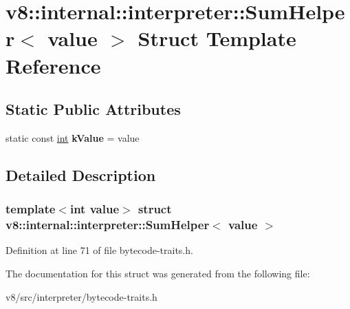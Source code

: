 \hypertarget{structv8_1_1internal_1_1interpreter_1_1SumHelper_3_01value_01_4}{}\section{v8\+:\+:internal\+:\+:interpreter\+:\+:Sum\+Helper$<$ value $>$ Struct Template Reference}
\label{structv8_1_1internal_1_1interpreter_1_1SumHelper_3_01value_01_4}
\subsection*{Static Public Attributes}
\begin{DoxyCompactItemize}
\item 
\mbox{\label{structv8_1_1internal_1_1interpreter_1_1SumHelper_3_01value_01_4_a1d4f285b4e2d654ca1549e40f2d1a085}} 
static const \mbox{\hyperlink{classint}{int}} {\bfseries k\+Value} = value
\end{DoxyCompactItemize}


\subsection{Detailed Description}
\subsubsection*{template$<$int value$>$\newline
struct v8\+::internal\+::interpreter\+::\+Sum\+Helper$<$ value $>$}



Definition at line 71 of file bytecode-\/traits.\+h.



The documentation for this struct was generated from the following file\+:\begin{DoxyCompactItemize}
\item 
v8/src/interpreter/bytecode-\/traits.\+h\end{DoxyCompactItemize}
